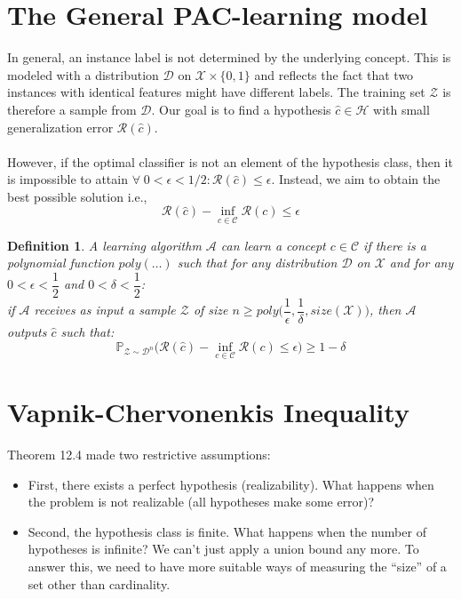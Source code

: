 \documentclass[twoside]{article}
\newtheorem{definition}[theorem]{Definition}
\begin{document}
\section{The General PAC-learning model}
In general, an instance label is not determined by the underlying concept. This is modeled with a distribution $\mathcal{D}$ on $\mathcal{X} \times \{0,1\}$ and reflects the fact that two instances with identical features might have different labels. The training set $\mathcal{Z}$ is therefore a sample from $\mathcal{D}$. Our goal is to find a hypothesis $\hat{c} \in \mathcal{H}$ with small generalization error $\mathcal{R}(\hat{c})$. \\ \\
However, if the optimal classifier is not an element of the hypothesis class, then it is impossible to attain $ \forall  \; 0  < \epsilon < 1/2: \mathcal{R}(\hat{c}) \leq \epsilon$. Instead, we aim to obtain the best possible solution i.e.,
$$\mathcal{R}(\hat{c}) - \inf_{c \in \mathcal{C}}{\mathcal{R}(c) \leq \epsilon}$$

\begin{definition}
A learning algorithm $\mathbf{\mathcal{A}}$ can learn a concept $c \in \mathbf{\mathcal{C}}$ if there is a polynomial function $poly(\ldots)$ such that for any distribution $\mathbf{\mathcal{D}}$ on $\mathbf{\mathcal{X}}$ and for any $0 < \epsilon <\dfrac{1}{2}$ and $0 < \delta <\dfrac{1}{2}$: \\
if $\mathbf{\mathcal{A}}$ receives as input a sample $\mathbf{\mathcal{Z}}$ of size $n \geq poly\Big(\dfrac{1}{\epsilon},\dfrac{1}{\delta},size(\mathcal{X})\Big)$, then $\mathbf{\mathcal{A}}$ outputs $\hat{c}$ such that:
$$\mathbf{\mathbb{P}}_{\mathcal{Z} \sim \mathcal{D}^n}\Big(\mathcal{R}(\hat{c}) - \inf_{c \in \mathcal{C}}{\mathcal{R}(c)} \leq \epsilon \Big) \geq 1- \delta$$
\end{definition}
\newpage

\section{Vapnik-Chervonenkis Inequality}

Theorem 12.4 made two restrictive assumptions:
\begin{itemize}
    \item First, there exists a perfect hypothesis (realizability). What happens when the
problem is not realizable (all hypotheses make some error)? 
\item Second, the hypothesis class is finite. What happens when the number of hypotheses is infinite? We can’t just apply a union bound any more. To answer
this, we need to have more suitable ways of measuring the “size” of a set other
than cardinality. 
\end{itemize}
\end{document}
